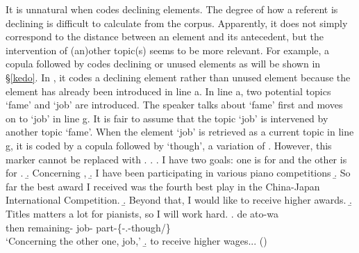 It is unnatural when  codes declining elements.
The degree of how a referent is declining is difficult to calculate from the corpus.
Apparently, it does not simply correspond to the distance between an element and its antecedent,
but the intervention of (an)other topic(s) seems to be more relevant.
For example,
a copula followed by  codes declining or unused elements as will be shown in \S \ref{kedo}.
In \Next[g],
it codes a declining element rather than unused element
because the element has already been introduced in line a.
In line a, two potential topics `fame' and `job' are introduced.
The speaker talks about `fame' first and moves on to `job' in line g.
It is fair to assume that the topic `job' is intervened by another topic `fame'.
When the element `job' is retrieved as a current topic in line g,
it is coded by a copula followed by  `though',
a variation of .
However,
this marker cannot be replaced with .
%
\ex.\label{sigoto}
 \a. I have two goals: one is for  and the other is for .
 \b. Concerning ,
 \b. I have been participating in various piano competitions
 \b. So far the best award I received was the fourth best play in the China-Japan International Competition.
 \b. Beyond that, I would like to receive higher awards.
 \b. Titles matters a lot for pianists, so I will work hard.
 \bg. de ato-wa   \\
 	then remaining- job- part-\{-.-though/\} \\
	`Concerning the other one, job,'
 \b. to receive higher wages...
\hfill{()}
%





